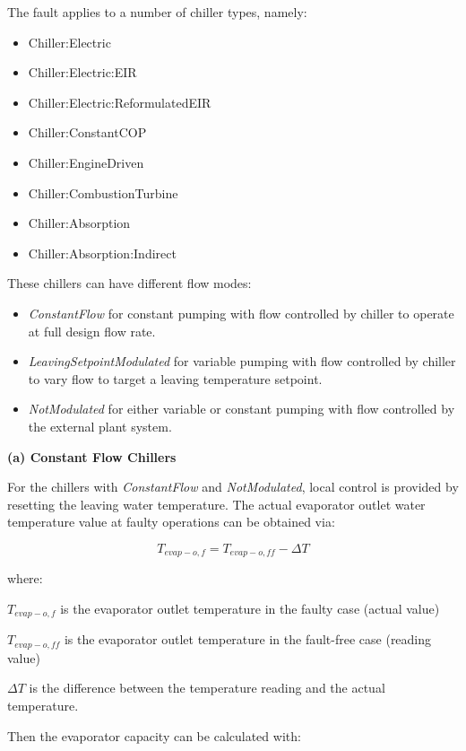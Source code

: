 The fault applies to a number of chiller types, namely:

\begin{itemize}
\tightlist
\item
  Chiller:Electric
\item
  Chiller:Electric:EIR
\item
  Chiller:Electric:ReformulatedEIR
\item
  Chiller:ConstantCOP
\item
  Chiller:EngineDriven
\item
  Chiller:CombustionTurbine
\item
  Chiller:Absorption
\item
  Chiller:Absorption:Indirect
\end{itemize}

These chillers can have different flow modes:

\begin{itemize}
\tightlist
\item
  \emph{ConstantFlow} for constant pumping with flow controlled by chiller to operate at full design flow rate.
\item
  \emph{LeavingSetpointModulated} for variable pumping with flow controlled by chiller to vary flow to target a leaving temperature setpoint.
\item
  \emph{NotModulated} for either variable or constant pumping with flow controlled by the external plant system.
\end{itemize}

\textbf{(a) Constant Flow Chillers}

For the chillers with \emph{ConstantFlow} and \emph{NotModulated}, local control is provided by resetting the leaving water temperature. The actual evaporator outlet water temperature value at faulty operations can be obtained via:

\begin{equation}
T_{evap-o,f} = T_{evap-o,ff} - \Delta T
\end{equation}

where:

\(T_{evap-o,f}\) is the evaporator outlet temperature in the faulty case (actual value)

\(T_{evap-o,ff}\) is the evaporator outlet temperature in the fault-free case (reading value)

\(\Delta T\) is the difference between the temperature reading and the actual temperature.

Then the evaporator capacity can be calculated with:

